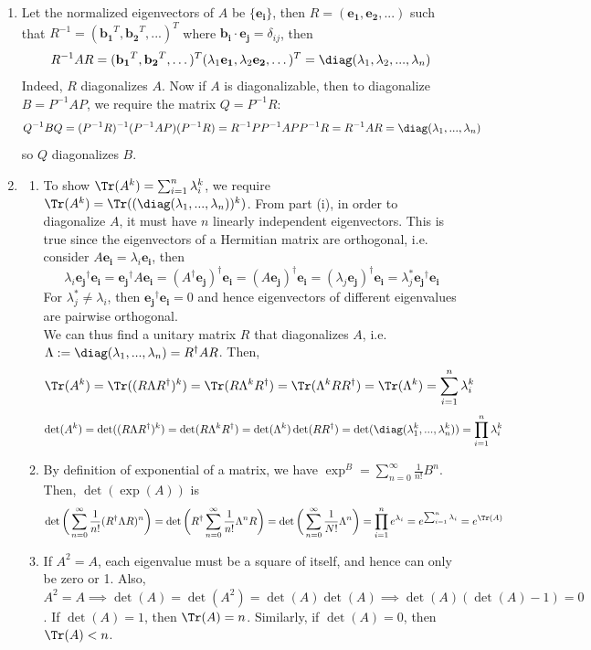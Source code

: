 \documentclass[a4paper]{article}
\begin{document}
\begin{ans}\leavevmode
\begin{enumerate}[label=(\roman*)]
\item Let the normalized eigenvectors of $A$ be $\{\mathbf{e_i}\}$, then $R=(\mathbf{e_1},\mathbf{e_2},...)$ such that $R^{-1}=(\mathbf{b_1}^T,\mathbf{b_2}^T,...)^T$ where $\mathbf{b_i}\cdot\mathbf{e_j}=\delta_{ij}$, then
$$R^{-1}AR=(\mathbf{b_1}^T,\mathbf{b_2}^T,\dots)^T(\lambda_1\mathbf{e_1},\lambda_2\mathbf{e_2},\dots)^T=\diag(\lambda_1,\lambda_2,...,\lambda_n)$$
Indeed, $R$ diagonalizes $A$. Now if $A$ is diagonalizable, then to diagonalize $B=P^{-1}AP$, we require the matrix $Q=P^{-1}R$:
$$Q^{-1}BQ=(P^{-1}R)^{-1}(P^{-1}AP)(P^{-1}R)=R^{-1}PP^{-1}APP^{-1}R=R^{-1}AR=\diag(\lambda_1,...,\lambda_n)$$
so $Q$ diagonalizes $B$.
\item 
\begin{enumerate}[label=(\alph*)]
\item To show $\Tr(A^k)=\sum_{i=1}^n\lambda_i^k$, we require $\Tr(A^k)=\Tr((\diag(\lambda_1,...,\lambda_n))^k)$. From part (i), in order to diagonalize $A$, it must have $n$ linearly independent eigenvectors. This is true since the eigenvectors of a Hermitian matrix are orthogonal, i.e. consider $A\mathbf{e_i}=\lambda_i\mathbf{e_i}$, then
$$\lambda_i\mathbf{e_j}^\dag\mathbf{e_i}=\mathbf{e_j}^\dag A\mathbf{e_i}=(A^\dag\mathbf{e_j})^\dag\mathbf{e_i}=(A\mathbf{e_j})^\dag\mathbf{e_i}=(\lambda_j\mathbf{e_j})^\dag\mathbf{e_i}=\lambda_j^*\mathbf{e_j}^\dag\mathbf{e_i}$$
For $\lambda_j^*\neq\lambda_i$, then $\mathbf{e_j}^\dag\mathbf{e_i}=0$ and hence eigenvectors of different eigenvalues are pairwise orthogonal.\\[5pt] 
We can thus find a unitary matrix $R$ that diagonalizes $A$, i.e. $\Lambda:=\diag(\lambda_1,...,\lambda_n)=R^\dag AR$. Then,
$$\Tr(A^k)=\Tr((R\Lambda R^\dag)^k)=\Tr(R\Lambda^kR^\dag)=\Tr(\Lambda^kRR^\dag)=\Tr(\Lambda^k)=\sum_{i=1}^n\lambda_i^k$$
$$\det(A^k)=\det((R\Lambda R^\dag)^k)=\det(R\Lambda^kR^\dag)=\det(\Lambda^k)\det(RR^\dag)=\det(\diag(\lambda_1^k,...,\lambda_n^k))=\prod_{i=1}^n\lambda_i^k$$
\item By definition of exponential of a matrix, we have $\exp^B=\sum_{n=0}^\infty\frac{1}{n!}B^n$. Then, $\det(\exp(A))$ is
$$\det\bigg(\sum_{n=0}^\infty\frac{1}{n!}(R^\dag\Lambda R)^n\bigg)=\det\bigg(R^\dag\sum_{n=0}^\infty\frac{1}{n!}\Lambda^nR\bigg)=\det\bigg(\sum_{n=0}^\infty\frac{1}{N!}\Lambda^n\bigg)=\prod_{i=1}^ne^{\lambda_i}=e^{\sum_{i=1}^n\lambda_i}=e^{\Tr(A)}$$
\item If $A^2=A$, each eigenvalue must be a square of itself, and hence can only be zero or 1. Also, $A^2=A\implies\det(A)=\det(A^2)=\det(A)\det(A)\implies\det(A)(\det(A)-1)=0$. If $\det(A)=1$, then $\Tr(A)=n$. Similarly, if $\det(A)=0$, then $\Tr(A)<n$.
\end{enumerate}
\end{enumerate}
\end{ans}
\end{document}
